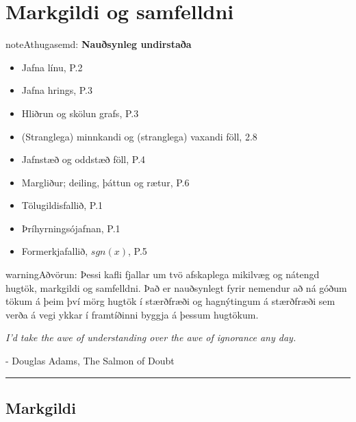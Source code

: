 \documentclass[b5paper,11pt,icelandic]{sphinxmanual}
\begin{document}
\chapter{Markgildi og samfelldni}
\label{kafli02:markgildi-og-samfelldni}\label{kafli02::doc}
\begin{notice}{note}{Athugasemd:}
\textbf{Nauðsynleg undirstaða}
\begin{itemize}
\item {} 
Jafna línu, P.2

\item {} 
Jafna hrings, P.3

\item {} 
Hliðrun og skölun grafs, P.3

\item {} 
(Stranglega) minnkandi og (stranglega) vaxandi föll, 2.8

\item {} 
Jafnstæð og oddstæð föll, P.4

\item {} 
Margliður; deiling, þáttun og rætur, P.6

\item {} 
Tölugildisfallið, P.1

\item {} 
Þríhyrningsójafnan, P.1

\item {} 
Formerkjafallið, \(sgn(x)\), P.5

\end{itemize}
\end{notice}

\begin{notice}{warning}{Aðvörun:}
Þessi kafli fjallar um tvö afskaplega mikilvæg og nátengd hugtök,
markgildi og samfelldni. Það er nauðsynlegt fyrir nemendur að ná
góðum tökum á þeim því mörg hugtök í stærðfræði og hagnýtingum á stærðfræði
sem verða á vegi ykkar í framtíðinni byggja á þessum hugtökum.
\end{notice}

\emph{I'd take the awe of understanding over the awe of ignorance any day.}

- Douglas Adams, The Salmon of Doubt


\bigskip\hrule{}\bigskip



\section{Markgildi}
\label{kafli02:markgildi}\label{kafli02:id1}
\end{document}
